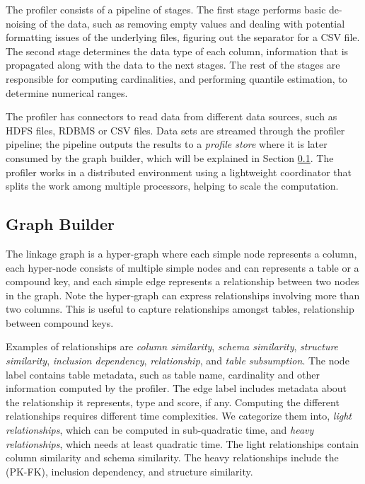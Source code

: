 The profiler consists of a pipeline of stages. The first stage
performs basic de-noising of the data, such as removing empty values and dealing
with potential formatting issues of the underlying files, \eg figuring out the
separator for a CSV file.  The second stage determines the data type of each
column, information that is propagated along with the data to the next stages.
The rest of the stages are responsible for computing cardinalities, and performing
quantile estimation, \eg to determine numerical ranges.

The profiler has connectors to read data from different data sources, such as
HDFS files, RDBMS or CSV files. Data sets are streamed through the profiler
pipeline;  the pipeline outputs the results
to a {\it profile store} where it is later consumed by the graph builder, which
will be explained in Section \ref{subsec:graphbuild}.
The profiler works in a distributed environment using a lightweight coordinator
that splits the work among multiple processors, helping to scale the
computation.



\subsection{Graph Builder}
\label{subsec:graphbuild}

The linkage graph is a hyper-graph where each simple node represents a column, each hyper-node consists of multiple simple nodes and can represents a table or a compound key, and each simple edge represents a relationship between two nodes in the graph. Note the hyper-graph can express relationships involving more than two columns. This is useful to capture relationships amongst tables, \eg \pkfk relationship between compound keys.

Examples of relationships are 
\emph{column similarity}, 
\emph{schema similarity}, 
\emph{structure similarity}, %
\emph{inclusion dependency}, 
\emph{\pkfk relationship}, and
\emph{table subsumption}. 
The node label contains table metadata, such as table name, cardinality and
other information computed by the profiler. The edge label includes metadata
about the relationship it represents, \eg type and score, if any. Computing
the different relationships requires different time complexities. We 
categorize them into, \textit{light relationships}, which can be computed in
sub-quadratic time, and \textit{heavy relationships}, which needs at least
quadratic time. The light relationships contain column similarity and schema
similarity. The heavy relationships include the \pkfk (PK-FK), inclusion dependency, and structure similarity. 


